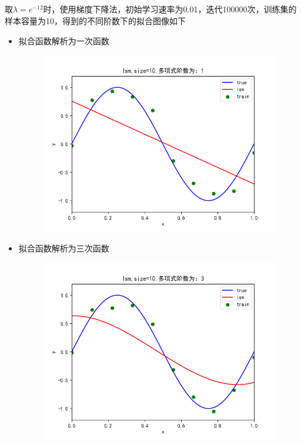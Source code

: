 \documentclass[lang=cn,a4paper,cite=authoryear]{elegantpaper}
\begin{document}
\subsection*{}
取$\lambda =e^{-12}$时，使用梯度下降法，初始学习速率为0.01，迭代100000次，训练集的样本容量为10，得到的不同阶数下的拟合图像如下
\begin{itemize}
	\item 拟合函数解析为一次函数
	\begin{figure}[H]
		\centering
		\includegraphics[scale=0.5]{g1}
	\end{figure}
	\item 拟合函数解析为三次函数
	\begin{figure}[H]
		\centering
		\includegraphics[scale=0.5]{g3}

\end{figure}
\end{itemize}
\end{document}
